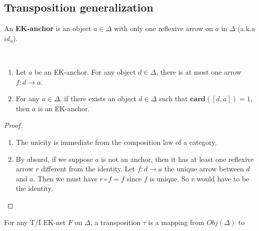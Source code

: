 \documentclass{report}
\begin{document}
\subsection{Transposition generalization}


\begin{defn}
    An \textbf{EK-anchor} is an object $a\in\Delta$  with only one reflexive arrow on $a$ in $\Delta$ (a.k.a $id_a$).
\end{defn}

\begin{prop}~
    \begin{enumerate}
        \item Let $a$ be an EK-anchor. For any object $d \in \Delta$, there is at most one arrow $f:d\rightarrow a$.
        \item For any $a\in \Delta$, if there exists an object $d\in \Delta$ such that $\textbf{card}([d,a]) = 1$, then $a$ is an EK-anchor.
    \end{enumerate}
    \label{anchorProp}
\end{prop}

\begin{proof}
    \begin{enumerate}
        \item The unicity is immediate from the composition law of a category.
        \item By absurd, if we suppose $a$ is not an anchor, then it has at least one reflexive arrow $r$ different from the identity. Let $f : d\rightarrow a$ the unique arrow between $d$ and $a$. Then we must have $r \circ f = f$ since $f$ is unique. So $r$ would have to be the identity.
    \end{enumerate}
\end{proof}

\begin{defn}
    For any T/I EK-net $F$ on $\Delta$, a transposition $\tau$ is a mapping from $Obj(\Delta)$ to $ $
\end{defn}
\end{document}
